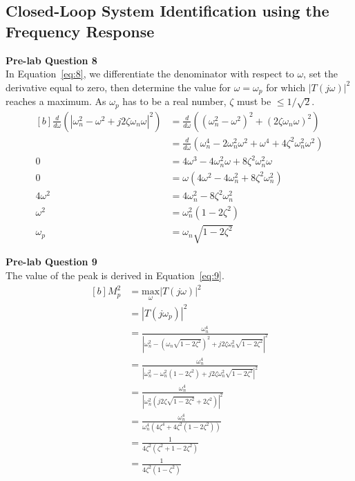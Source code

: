 \documentclass[12pt]{article}
\begin{document}
\subsection{Closed-Loop System Identification using the Frequency Response}
\textbf{Pre-lab Question 8} \\
In Equation~\ref{eq:8}, we differentiate the denominator with respect to $\omega$, set the derivative equal to zero, then determine the value for $\omega = \omega_p$ for which $\left| T(j\omega) \right|^2$ reaches a maximum. As $\omega_p$ has to be a real number, $\zeta$ must be $\leq 1/\sqrt{2}$.
\begin{equation} \label{eq:8}
\begin{aligned}[b]
    \frac{d}{d\omega} \left( \left|\omega_n^2 - \omega^2 + j2\zeta\omega_n\omega \right|^2 \right) &= \frac{d}{d\omega} \left( (\omega_n^2 - \omega^2)^2 + (2 \zeta \omega_n \omega)^2 \right) \\
    &= \frac{d}{d\omega} \left( \omega_n^4 - 2\omega_n^2\omega^2 + \omega^4 + 4\zeta^2\omega_n^2\omega^2 \right) \\
    0 &= 4\omega^3 - 4\omega_n^2\omega + 8\zeta^2\omega_n^2\omega \\
    0 &= \omega \left( 4\omega^2 - 4\omega_n^2 + 8\zeta^2\omega_n^2 \right) \\
    4\omega^2 &= 4\omega_n^2 - 8\zeta^2\omega_n^2 \\
    \omega^2 &= \omega_n^2 \left( 1 - 2\zeta^2 \right) \\
    \omega_p &= \omega_n \sqrt{1 - 2\zeta^2}
\end{aligned}
\end{equation}

\textbf{Pre-lab Question 9} \\
The value of the peak is derived in Equation~\ref{eq:9}.
\begin{equation} \label{eq:9}
\begin{aligned}[b]
    M_p^2 &= \underset{\omega}{\text{max}}\left| T(j\omega) \right|^2 \\
    &= \left| T(j\omega_p) \right|^2 \\
    &= \frac{\omega_n^4}{\left| \omega_n^2 - (\omega_n\sqrt{1-2\zeta^2})^2 + j2\zeta\omega_n^2\sqrt{1-2\zeta^2} \right|^2} \\
    &= \frac{\omega_n^4}{\left| \omega_n^2 - \omega_n^2(1-2\zeta^2) + j2\zeta\omega_n^2\sqrt{1-2\zeta^2} \right|^2} \\
    &= \frac{\omega_n^4}{\left| \omega_n^2 \left( j2\zeta\sqrt{1-2\zeta^2} + 2\zeta^2 \right) \right|^2} \\
    &= \frac{\omega_n^4}{\omega_n^4 (4\zeta^4 + 4\zeta^2 (1-2\zeta^2))} \\
    &= \frac{1}{4\zeta^2 (\zeta^2 + 1 - 2\zeta^2)} \\
    &= \frac{1}{4\zeta^2 (1 - \zeta^2)}
\end{aligned}
\end{equation}
\end{document}

